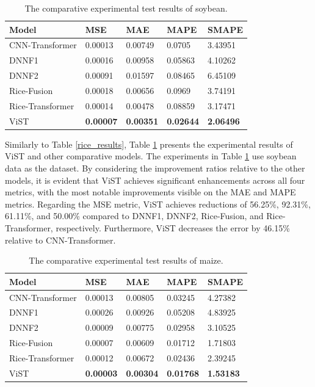 \documentclass[acmsmall,manuscript, screen, review]{acmart}
\begin{document}
\begin{table}[htbp]
  \centering
  \caption{The comparative experimental test results of soybean.}
    \begin{tabular}{lllll}
    \toprule
    Model & MSE & MAE & MAPE & SMAPE \\
    \midrule
    CNN-Transformer & 0.00013 & 0.00749 & 0.0705 & 3.43951 \\
    DNNF1 & 0.00016 & 0.00958 & 0.05863 & 4.10262 \\
    DNNF2 & 0.00091 & 0.01597 & 0.08465 & 6.45109 \\
    Rice-Fusion & 0.00018 & 0.00656 & 0.0969 & 3.74191 \\
    Rice-Transformer & 0.00014 & 0.00478 & 0.08859 & 3.17471 \\
    ViST  & \textbf{0.00007} & \textbf{0.00351} & \textbf{0.02644} & \textbf{2.06496} \\
    \bottomrule
    \end{tabular}%
  \label{soybean_results}%
\end{table}%

Similarly to Table \ref{rice_results}, Table \ref{soybean_results} presents the experimental results of ViST and other comparative models. The experiments in Table \ref{soybean_results} use soybean data as the dataset. By considering the improvement ratios relative to the other models, it is evident that ViST achieves significant enhancements across all four metrics, with the most notable improvements visible on the MAE and MAPE metrics. Regarding the MSE metric, ViST achieves reductions of 56.25\%, 92.31\%, 61.11\%, and 50.00\% compared to DNNF1, DNNF2, Rice-Fusion, and Rice-Transformer, respectively. Furthermore, ViST decreases the error by 46.15\% relative to CNN-Transformer.

\begin{table}[htbp]
  \centering
  \caption{The comparative experimental test results of maize.}
    \begin{tabular}{lllll}
    \toprule
    Model & \multicolumn{1}{l}{MSE} & \multicolumn{1}{l}{MAE} & \multicolumn{1}{l}{MAPE} & \multicolumn{1}{l}{SMAPE} \\
    \midrule
    CNN-Transformer & 0.00013 & 0.00805 & 0.03245 & 4.27382 \\
    DNNF1 & 0.00026 & 0.00926 & 0.05208 & 4.83925 \\
    DNNF2 & 0.00009 & 0.00775 & 0.02958 & 3.10525 \\
    Rice-Fusion & 0.00007 & 0.00609 & 0.01712 & 1.71803 \\
    Rice-Transformer & 0.00012 & 0.00672 & 0.02436 & 2.39245 \\
    ViST  & \textbf{0.00003} & \textbf{0.00304} & \textbf{0.01768} & \textbf{1.53183} \\
    \bottomrule
    \end{tabular}%
  \label{tab:maize_results}%
\end{table}%
\end{document}
